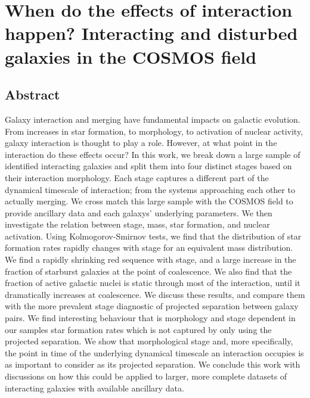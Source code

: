 \chapter{When do the effects of interaction happen? Interacting and disturbed galaxies in the COSMOS field}\label{chapter3}
\section{Abstract}
   Galaxy interaction and merging have fundamental impacts on galactic evolution. From increases in star formation, to morphology, to activation of nuclear activity, galaxy interaction is thought to play a role. However, at what point in the interaction do these effects occur? In this work, we break down a large sample of identified interacting galaxies and split them into four distinct stages based on their interaction morphology. Each stage captures a different part of the dynamical timescale of interaction; from the systems approaching each other to actually merging. We cross match this large sample with the COSMOS field to provide ancillary data and each galaxys' underlying parameters. We then investigate the relation between stage, mass, star formation, and nuclear activation. Using Kolmogorov-Smirnov tests, we find that the distribution of star formation rates rapidly changes with stage for an equivalent mass distribution. We find a rapidly shrinking red sequence with stage, and a large increase in the fraction of starburst galaxies at the point of coalescence. We also find that the fraction of active galactic nuclei is static through most of the interaction, until it dramatically increases at coalescence. We discuss these results, and compare them with the more prevalent stage diagnostic of projected separation between galaxy pairs. We find interesting behaviour that is morphology and stage dependent in our samples star formation rates which is not captured by only using the projected separation. We show that morphological stage and, more specifically, the point in time of the underlying dynamical timescale an interaction occupies is as important to consider as its projected separation. We conclude this work with discussions on how this could be applied to larger, more complete datasets of interacting galaxies with available ancillary data.




